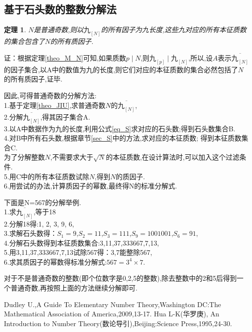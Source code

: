 \documentclass[a4paper]{article}
\newtheorem{theorem}{定理}[section]
\numberwithin{equation}{section}
\begin{document}
\subsection{基于石头数的整数分解法}

\begin{theorem} \label{theo_factorization} $N$是普通奇数,则以$九_{[N]}$的所有因子为九长度,这些九对应的所有本征质数的集合包含了$N$的所有质因子.\end{theorem}
	证：根据定理\ref{theo_M_N}可知,如果质数$p \mid N$,则$九_{[p]}\mid 九_{[N]}$,所以,设$A$表示$\overline{九_{[N]}}$的因子集合,以A中的数值为九的长度,则它们对应的本征质数的集合必然包括了$N$的所有质因子,证毕.

因此,可得普通奇数的分解方法:\\
1.基于定理\ref{theo_JIU},求普通奇数$N$的$\overline{九_{[N]}}$,\\
2.分解$\overline{九_{[N]}}$,得其因子集合A.\\
3.以A中数据作为九的长度,利用公式\ref{eq_S}求对应的石头数;得到石头数集合B.\\
4.对B中所有石头数,根据章节\ref{sec_S}中的方法,求对应的本征质数; 得到本征质数集合C.\\
\indent 为了分解整数$N$,不需要求大于$\sqrt{N}$的本征质数,在设计算法时,可以加入这个过滤条件.\\
5.用C中的所有本征质数试除$N$,得到$N$的质因子.\\
6.用尝试的办法,计算质因子的幂数,最终得N的标准分解式.

下面是N=567的分解举例.\\
1.求$\overline{九_{[N]}}$,等于18\\
2.分解18得:{1, 2, 3, 9, 6},\\
3.求解石头数得：$S_1=9$,$S_2=11$,$S_3=111$,$S_9=1001001$,$S_6=91$,\\
4.分解石头数得到本征质数集合:{3,11,37,333667,7,13},\\
5.用3,11,37,333667,7,13试除567得：3,7能整除567,\\
6.求其质因子的幂数得标准分解式:$567=3^4 \times 7$.

对于不是普通奇数的整数(即个位数字是0,2,5的整数),除去整数中的2和5后得到一个普通奇数,再按照上面的方法继续分解即可.

\renewcommand{\refname}{参考文献}
\begin{thebibliography}{99}
 Dudley U.,A Guide To Elementary Number Theory,Washington DC:The Mathematical Association of America,2009,13-17.
 Hua L-K(华罗庚), An Introduction to  Number Theory(数论导引),Beijing:Science Press,1995,24-30.
\end{thebibliography}
\end{document}
